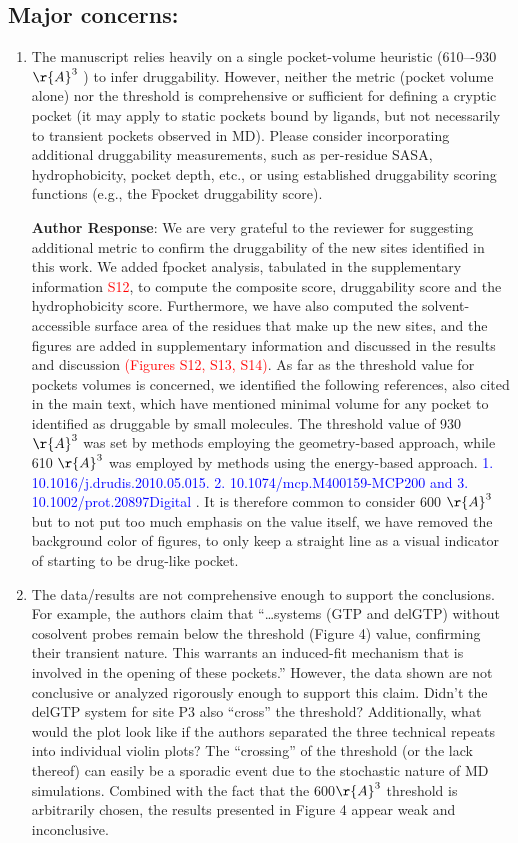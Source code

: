 \documentclass[11pt, a4paper]{article}
\begin{document}
\subsection{Major concerns:}
\begin{enumerate}
    \item The manuscript relies heavily on a single pocket-volume heuristic (610–-930 $\r{A}^3$  ) to infer druggability. However, neither the metric (pocket volume alone) nor the threshold is comprehensive or sufficient for defining a cryptic pocket (it may apply to static pockets bound by ligands, but not necessarily to transient pockets observed in MD). Please consider incorporating additional druggability measurements, such as per-residue SASA, hydrophobicity, pocket depth, etc., or using established druggability scoring functions (e.g., the Fpocket druggability score).

\textbf{Author Response}: We are very grateful to the reviewer for suggesting additional metric to confirm the druggability of the new sites identified in this work. We added fpocket analysis, tabulated in the supplementary information \textcolor{red}{S12}, to compute the composite score, druggability score and the hydrophobicity score. Furthermore, we have also computed the solvent-accessible surface area of the residues that make up the new sites, and the figures are added in supplementary information and discussed in the results and discussion \textcolor{red}{(Figures S12, S13, S14)}. As far as the threshold value for pockets volumes is concerned, we identified the following references, also cited in the main text, which have mentioned minimal volume for any pocket to identified as druggable by small molecules. The threshold value of 930 $\r{A}^3$ was set by methods employing the geometry-based approach, while 610 $\r{A}^3$ was employed by methods using the energy-based approach.
\textcolor{blue}{1. 10.1016/j.drudis.2010.05.015. 2.  10.1074/mcp.M400159-MCP200 and 3. 10.1002/prot.20897Digital }. It is therefore common to consider 600  $\r{A}^3$ but to not put too much emphasis on the value itself, we have removed the background color of figures, to only keep a straight line as a visual indicator of starting to be drug-like pocket.


    \item The data/results are not comprehensive enough to support the conclusions. For example, the authors claim that “…systems (GTP and delGTP) without cosolvent probes remain below the threshold (Figure 4) value, confirming their transient nature. This warrants an induced-fit mechanism that is involved in the opening of these pockets.” However, the data shown are not conclusive or analyzed rigorously enough to support this claim. Didn’t the delGTP system for site P3 also “cross” the threshold? Additionally, what would the plot look like if the authors separated the three technical repeats into individual violin plots? The “crossing” of the threshold (or the lack thereof) can easily be a sporadic event due to the stochastic nature of MD simulations. Combined with the fact that the 600$\r{A}^3$ threshold is arbitrarily chosen, the results presented in Figure 4 appear weak and inconclusive.


\end{enumerate}
\end{document}
